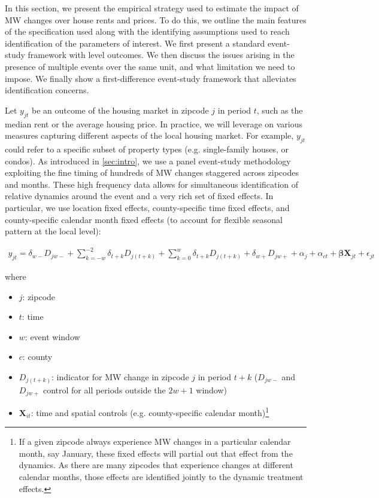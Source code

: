 In this section, we present the empirical strategy used to estimate the impact of MW changes over house rents and prices. To do this, we outline the main features of the specification used along with the identifying assumptions used to reach identification of the parameters of interest. We first present a standard event-study framework with level outcomes. We then discuss the issues arising in the presence of multiple events over the same unit, and what limitation we need to impose. We finally show a first-difference event-study framework that alleviates identification concerns.  

Let $y_{jt}$ be an outcome of the housing market in zipcode $j$ in period $t$, such as the median rent or the average housing price. In practice, we will leverage on various measures capturing different aspects of the local housing market. For example, $y_{jt}$ could refer to a specific subset of property types (e.g. single-family houses, or condos). As introduced in \autoref{sec:intro}, we use a panel event-study methodology exploiting the fine timing of hundreds of MW changes staggered across zipcodes and months. These high frequency data allows for simultaneous identification of relative dynamics around the event and a very rich set of fixed effects. In particular, we use location fixed effects, county-specific time fixed effects, and county-specific calendar month fixed effects (to account for flexible seasonal pattern at the local level):

\begin{equation}\label{eq:main_ziplevel}
    \begin{aligned}
        y_{jt} = \delta_{w-}D_{jw-} + \sum\limits_{k = -w}^{-2}\delta_{t + k} D_{j(t+k)} + \sum\limits_{k = 0}^{w}\delta_{t + k} D_{j(t + k)}  + \delta_{w+}D_{jw+} + \alpha_{j} + \alpha_{ct} + \boldsymbol{\beta} \boldsymbol{X}_{jt} +\epsilon_{jt} 
    \end{aligned}   
\end{equation}

where

\begin{itemize}
    \item $j$: zipcode
    \item $t$: time
    \item $w$: event window
    \item $c$: county
    \item $D_{j (t + k)}$: indicator for MW change in zipcode $j$ in period $t+k$ ($D_{jw-}$ and $D_{jw+}$ control for all periods outside the $2w + 1$ window)
    \item $\boldsymbol{X}_{it}$: time and spatial controls (e.g. county-specific calendar month)\footnote{If a given zipcode always experience MW changes in a particular calendar month, say January, these fixed effects will partial out that effect from the dynamics. As there are many zipcodes that experience changes at different calendar months, those effects are identified jointly to the dynamic treatment effects.}
\end{itemize}

